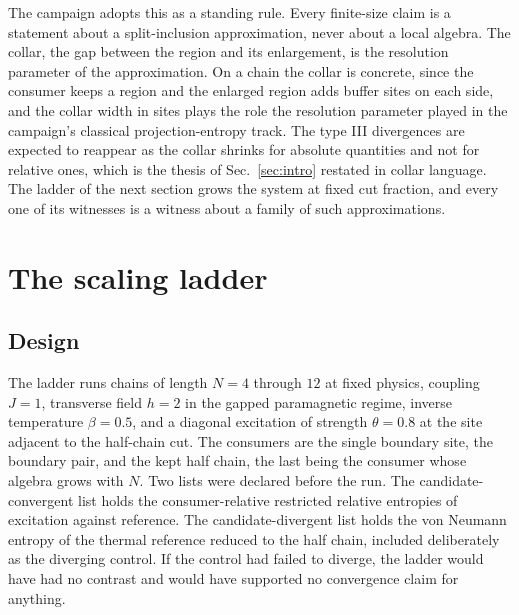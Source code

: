 \documentclass[aps,prd,reprint,nofootinbib,longbibliography]{revtex4-2}
\begin{document}
The campaign adopts this as a standing rule.  Every finite-size claim is
a statement about a split-inclusion approximation, never about a local
algebra.  The collar, the gap between the region and its enlargement, is
the resolution parameter of the approximation.  On a chain the collar is
concrete, since the consumer keeps a region and the enlarged region adds
buffer sites on each side, and the collar width in sites plays the role
the resolution parameter played in the campaign's classical
projection-entropy track.  The type III divergences are expected to
reappear as the collar shrinks for absolute quantities and not for
relative ones, which is the thesis of Sec.~\ref{sec:intro} restated in
collar language.  The ladder of the next section grows the system at
fixed cut fraction, and every one of its witnesses is a witness about a
family of such approximations.

\section{The scaling ladder}
\label{sec:ladder}

\subsection{Design}

The ladder runs chains of length $N=4$ through $12$ at fixed physics,
coupling $J=1$, transverse field $h=2$ in the gapped paramagnetic regime,
inverse temperature $\beta=0.5$, and a diagonal excitation of strength
$\theta=0.8$ at the site adjacent to the half-chain cut.  The consumers
are the single boundary site, the boundary pair, and the kept half chain,
the last being the consumer whose algebra grows with $N$.  Two lists were
declared before the run.  The candidate-convergent list holds the
consumer-relative restricted relative entropies of excitation against
reference.  The candidate-divergent list holds the von Neumann entropy of
the thermal reference reduced to the half chain, included deliberately as
the diverging control.  If the control had failed to diverge, the ladder
would have had no contrast and would have supported no convergence claim
for anything.
\end{document}
